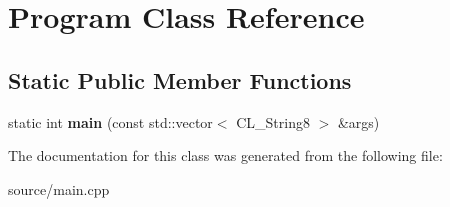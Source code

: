 \hypertarget{classProgram}{
\section{Program Class Reference}
\label{classProgram}
}
\subsection*{Static Public Member Functions}
\begin{DoxyCompactItemize}
\item 
\hypertarget{classProgram_add148f1ebc711f5d131d1cc6352375fd}{
static int {\bfseries main} (const std::vector$<$ CL\_\-String8 $>$ \&args)}
\label{classProgram_add148f1ebc711f5d131d1cc6352375fd}

\end{DoxyCompactItemize}


The documentation for this class was generated from the following file:\begin{DoxyCompactItemize}
\item 
source/main.cpp\end{DoxyCompactItemize}
